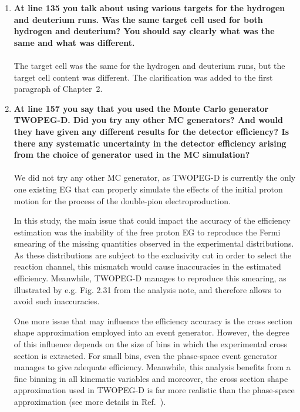 \documentclass[,superscriptaddress,showpacs,amssymb,amsmath,amsfonts,linenumbers,article]{revtex4-1}
\begin{document}
\begin{enumerate}[label=\textbf{\arabic*}.]

\item {\bf At line 135 you talk about using various targets for the hydrogen and deuterium runs. Was the same target cell used for both hydrogen and deuterium? You should say clearly what was the same and what was different.}\\ \\
The target cell was the same for the hydrogen and deuterium runs, but the target cell content was different. The clarification was added to the first paragraph of Chapter~2. 


\item {\bf At line 157 you say that you used the Monte Carlo generator TWOPEG-D. Did you try any other MC generators? And would they have given any different results for the detector efficiency? Is there any systematic uncertainty in the detector efficiency arising from the choice of generator used in the MC simulation?}\\ \\
We did not try any other MC generator, as TWOPEG-D is currently the only one existing EG that can properly simulate the effects of the initial proton motion for the process of the double-pion electroproduction.

In this study, the main issue that could impact the accuracy of the efficiency estimation was the inability of the free proton EG to reproduce the Fermi smearing of the missing quantities observed in the experimental distributions. As these distributions are subject to the exclusivity cut in order to select the reaction channel, this mismatch would cause inaccuracies in the estimated efficiency. Meanwhile, TWOPEG-D manages to reproduce this smearing, as illustrated by e.g. Fig. 2.31 from the analysis note, and therefore allows to avoid such inaccuracies.

One more issue that may influence the efficiency accuracy is the cross section shape approximation employed into an event generator. However, the degree of this influence depends on the size of bins in which the experimental cross section is extracted. For small bins, even the phase-space event generator manages to give adequate efficiency. Meanwhile, this analysis benefits from a fine binning in all kinematic variables and moreover, the cross section shape approximation used in TWOPEG-D is far more realistic than the phase-space approximation (see more details in Ref.~\cite{twopeg_d}). 


\end{enumerate}
\end{document}
